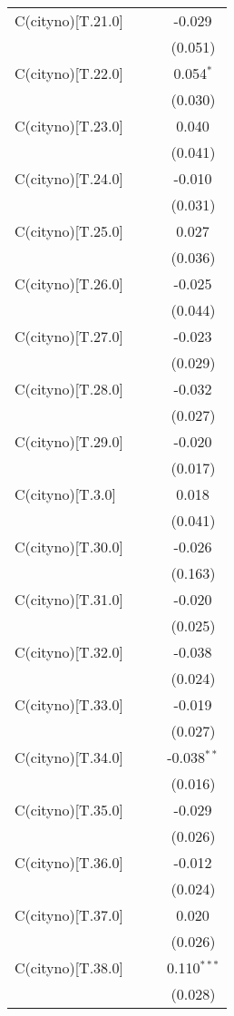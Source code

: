 \begin{table}[!htbp]
\begin{tabular}{@{\extracolsep{5pt}}lccc}
 C(cityno)[T.21.0] & & & -0.029$^{}$ \\
& & & (0.051) \\
 C(cityno)[T.22.0] & & & 0.054$^{*}$ \\
& & & (0.030) \\
 C(cityno)[T.23.0] & & & 0.040$^{}$ \\
& & & (0.041) \\
 C(cityno)[T.24.0] & & & -0.010$^{}$ \\
& & & (0.031) \\
 C(cityno)[T.25.0] & & & 0.027$^{}$ \\
& & & (0.036) \\
 C(cityno)[T.26.0] & & & -0.025$^{}$ \\
& & & (0.044) \\
 C(cityno)[T.27.0] & & & -0.023$^{}$ \\
& & & (0.029) \\
 C(cityno)[T.28.0] & & & -0.032$^{}$ \\
& & & (0.027) \\
 C(cityno)[T.29.0] & & & -0.020$^{}$ \\
& & & (0.017) \\
 C(cityno)[T.3.0] & & & 0.018$^{}$ \\
& & & (0.041) \\
 C(cityno)[T.30.0] & & & -0.026$^{}$ \\
& & & (0.163) \\
 C(cityno)[T.31.0] & & & -0.020$^{}$ \\
& & & (0.025) \\
 C(cityno)[T.32.0] & & & -0.038$^{}$ \\
& & & (0.024) \\
 C(cityno)[T.33.0] & & & -0.019$^{}$ \\
& & & (0.027) \\
 C(cityno)[T.34.0] & & & -0.038$^{**}$ \\
& & & (0.016) \\
 C(cityno)[T.35.0] & & & -0.029$^{}$ \\
& & & (0.026) \\
 C(cityno)[T.36.0] & & & -0.012$^{}$ \\
& & & (0.024) \\
 C(cityno)[T.37.0] & & & 0.020$^{}$ \\
& & & (0.026) \\
 C(cityno)[T.38.0] & & & 0.110$^{***}$ \\
& & & (0.028) \\

\end{tabular}
\end{table}
